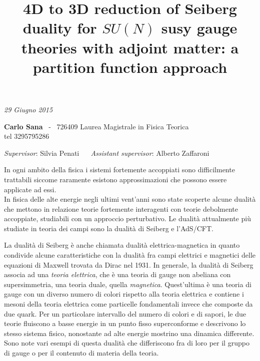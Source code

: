 \documentclass[a4paper,12pt]{article}
\date{}
\title{\boldmath \textbf{4D to 3D reduction of Seiberg duality for $SU(N)$ susy gauge theories with adjoint matter: a partition function approach }
 }
\begin{document}
\maketitle
\vspace*{-2.3cm}
\begin{center}
\textit {29 Giugno 2015} \\
 \end{center}
\vspace{-0.3cm}
	 \textbf{Carlo Sana}  ~-~ 726409  \hfill
 Laurea Magistrale in Fisica Teorica 
\\
 \hspace{2cm} tel   3295795286\\
\vspace{-0.5cm}
\begin{center}
\textit{Supervisor}: 
\textsf{Silvia Penati} 
~~
\textit{Assistant supervisor}:
\textsf{Alberto Zaffaroni}

\end{center}

In ogni ambito della fisica i sistemi fortemente accoppiati sono difficilmente trattabili siccome raramente esistono approssimazioni che possono essere applicate ad essi.\\
In fisica delle alte energie negli ultimi vent'anni sono state scoperte alcune dualità che mettono in relazione teorie fortemente interagenti con teorie debolmente accoppiate, studiabili con un approccio perturbativo.
Le dualità attualmente più studiate in teoria dei campi sono la dualità di Seiberg e l'AdS/CFT.

La dualità di Seiberg è anche chiamata dualità elettrica-magnetica in quanto condivide alcune caratteristiche con la dualità fra campi elettrici e magnetici delle equazioni di Maxwell trovata da Dirac nel 1931. 
In generale, la dualità di Seiberg associa ad una \emph{teoria elettrica}, che è una teoria di gauge non abeliana con supersimmetria, una teoria duale, quella \emph{magnetica}.
Quest'ultima è una teoria di gauge con un diverso numero di colori rispetto alla teoria elettrica e contiene i mesoni della teoria elettrica come particelle fondamentali invece che composte da due quark.
Per un particolare intervallo del numero di colori e di sapori, le due teorie fluiscono a basse energie in un punto fisso superconforme e descrivono lo stesso sistema fisico, nonostante ad alte energie mostrino una dinamica differente.
Sono note vari esempi di questa dualità che differiscono fra di loro per il gruppo di gauge o per il contenuto di materia della teoria.
\end{document}
